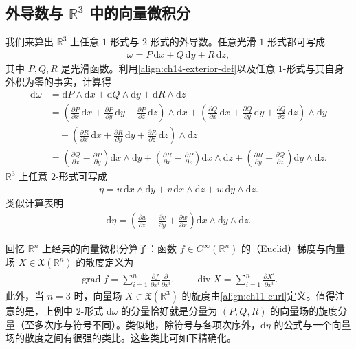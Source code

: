 \documentclass[../../main.tex]{subfiles}
\begin{document}
\subsection{外导数与 $\mathbb{R}^3$ 中的向量微积分}

\begin{example}\label{example:ch14-27forms}
我们来算出 $\mathbb{R}^3$ 上任意 $1$-形式与 $2$-形式的外导数。任意光滑 $1$-形式都可写成
\begin{align*}
\omega=P\,\mathrm{d}x+Q\,\mathrm{d}y+R\,\mathrm{d}z,
\end{align*}
其中 $P,Q,R$ 是光滑函数。利用\eqref{align:ch14-exterior-def}以及任意 $1$-形式与其自身外积为零的事实，计算得
\begin{align*}
\mathrm{d}\omega&=\mathrm{d}P\wedge\mathrm{d}x+\mathrm{d}Q\wedge\mathrm{d}y+\mathrm{d}R\wedge\mathrm{d}z\\
&=\left(\frac{\partial P}{\partial x}\,\mathrm{d}x+\frac{\partial P}{\partial y}\,\mathrm{d}y+\frac{\partial P}{\partial z}\,\mathrm{d}z\right)\wedge\mathrm{d}x
+\left(\frac{\partial Q}{\partial x}\,\mathrm{d}x+\frac{\partial Q}{\partial y}\,\mathrm{d}y+\frac{\partial Q}{\partial z}\,\mathrm{d}z\right)\wedge\mathrm{d}y\\
&\quad+\left(\frac{\partial R}{\partial x}\,\mathrm{d}x+\frac{\partial R}{\partial y}\,\mathrm{d}y+\frac{\partial R}{\partial z}\,\mathrm{d}z\right)\wedge\mathrm{d}z\\
&=\left(\frac{\partial Q}{\partial x}-\frac{\partial P}{\partial y}\right)\mathrm{d}x\wedge\mathrm{d}y
+\left(\frac{\partial R}{\partial x}-\frac{\partial P}{\partial z}\right)\mathrm{d}x\wedge\mathrm{d}z
+\left(\frac{\partial R}{\partial y}-\frac{\partial Q}{\partial z}\right)\mathrm{d}y\wedge\mathrm{d}z.
\end{align*}
$\mathbb{R}^3$ 上任意 $2$-形式可写成
\begin{align*}
\eta=u\,\mathrm{d}x\wedge\mathrm{d}y+v\,\mathrm{d}x\wedge\mathrm{d}z+w\,\mathrm{d}y\wedge\mathrm{d}z.
\end{align*}
类似计算表明
\begin{align*}
\mathrm{d}\eta=\left(\frac{\partial u}{\partial z}-\frac{\partial v}{\partial y}+\frac{\partial w}{\partial x}\right)\mathrm{d}x\wedge\mathrm{d}y\wedge\mathrm{d}z.
\end{align*}
\end{example}

回忆 $\mathbb{R}^n$ 上经典的向量微积分算子：函数 $f\in C^\infty(\mathbb{R}^n)$ 的（Euclid）梯度与向量场 $X\in\mathfrak X(\mathbb{R}^n)$ 的散度定义为
\begin{align}
\operatorname{grad}f=\sum_{i=1}^n\frac{\partial f}{\partial x^i}\frac{\partial}{\partial x^i},\qquad
\operatorname{div}X=\sum_{i=1}^n\frac{\partial X^i}{\partial x^i}.\label{align:ch14-div-grad}
\end{align}
此外，当 $n=3$ 时，向量场 $X\in\mathfrak X(\mathbb{R}^3)$ 的旋度由\eqref{align:ch11-curl}定义。值得注意的是，上例中 $2$-形式 $\mathrm{d}\omega$ 的分量恰好就是分量为 $(P,Q,R)$ 的向量场的旋度分量（至多次序与符号不同）。类似地，除符号与各项次序外，$\mathrm{d}\eta$ 的公式与一个向量场的散度之间有很强的类比。这些类比可如下精确化。
\end{document}
